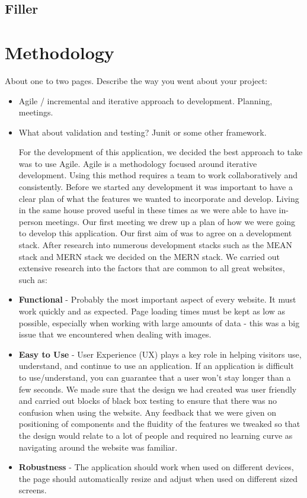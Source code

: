 \section{Filler}


\chapter{Methodology}
About one to two pages.
Describe the way you went about your project:
\begin{itemize}
\item Agile / incremental and iterative approach to development. Planning, meetings.
\item What about validation and testing? Junit or some other framework.


For the development of this application, we decided the best approach to take was to use Agile. Agile is a methodology focused around iterative development. Using this method requires a team to work collaboratively and consistently. Before we started any development it was important to have a clear plan of what the features we wanted to incorporate and develop. Living in the same house proved useful in these times as we were able to have in-person meetings. Our first meeting we drew up a plan of how we were going to develop this application. Our first aim of was to agree on a development stack. After research into numerous development stacks such as the MEAN stack and MERN stack we decided on the MERN stack. We carried out extensive research into the factors that are common to all great websites, such as:

\item \textbf{Functional} - Probably the most important aspect of every website. It must work quickly and as expected. Page loading times must be kept as low as possible, especially when working with large amounts of data - this was a big issue that we encountered when dealing with images.
\item \textbf{Easy to Use} - User Experience (UX) plays a key role in helping visitors use, understand, and continue to use an application. If an application is difficult to use/understand, you can guarantee that a user won't stay longer than a few seconds. We made sure that the design we had created was user friendly and carried out blocks of black box testing to ensure that there was no confusion when using the website. Any feedback that we were given on positioning of components and the fluidity of the features we tweaked so that the design would relate to a lot of people and required no learning curve as navigating around the website was familiar.
\item \textbf{Robustness} - The application should work when used on different devices, the page should automatically resize and adjust when used on different sized screens.


\end{itemize}
